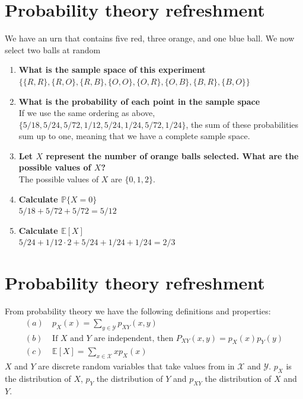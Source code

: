 \documentclass[a4paper]{article}
\def\E{\mathbb{E}}
\def\P{\mathbb{P}}
\begin{document}
\section{Probability theory refreshment}
We have an urn that contains five red, three orange, and one blue ball. We now select two balls at random
\begin{enumerate}
  \item \textbf{What is the sample space of this experiment}\\
    $\{\{R,R\},\{R,O\},\{R,B\},\{O,O\},\{O,R\},\{O,B\},\{B,R\},\{B,O\}\}$
  \item \textbf{What is the probability of each point in the sample space}\\
    If we use the same ordering as above, $\{5/18,5/24,5/72,1/12,5/24,1/24,5/72,1/24\}$, the sum of these probabilities sum up to one, meaning that we have a complete sample space.
  \item \textbf{Let $X$ represent the number of orange balls selected. What are the possible values of $X$?}\\
    The possible values of $X$ are $\{0,1,2\}.$
  \item \textbf{Calculate $\P\{X=0\}$}\\
    $5/18 + 5/72 + 5/72 = 5/12$
  \item \textbf{Calculate $\E[X]$}\\
    $5/24 + 1/12 \cdot 2 + 5/24 + 1/24 + 1/24 = 2/3$
\end{enumerate}
\section{Probability theory refreshment}
From probability theory we have the following definitions and properties:
\begin{align*}
(a) &\ p_X(x)=\sum_{y\in \mathcal{Y}}p_{XY}(x,y) \\
(b) &\ \mbox{If $X$ and $Y$ are independent, then $P_{XY}(x,y)=p_X(x)p_Y(y)$} \\
(c) &\ \mathbb{E}[X]=\sum_{x\in \mathcal{X}}xp_X(x)
\end{align*}
$X$ and $Y$ are discrete random variables that take values from in $\mathcal{X}$ and $\mathcal{Y}$. $p_X$ is the distribution of $X$, $p_Y$ the distribution of $Y$ and $p_{XY}$ the distribution of $X$ and $Y$.
\end{document}
